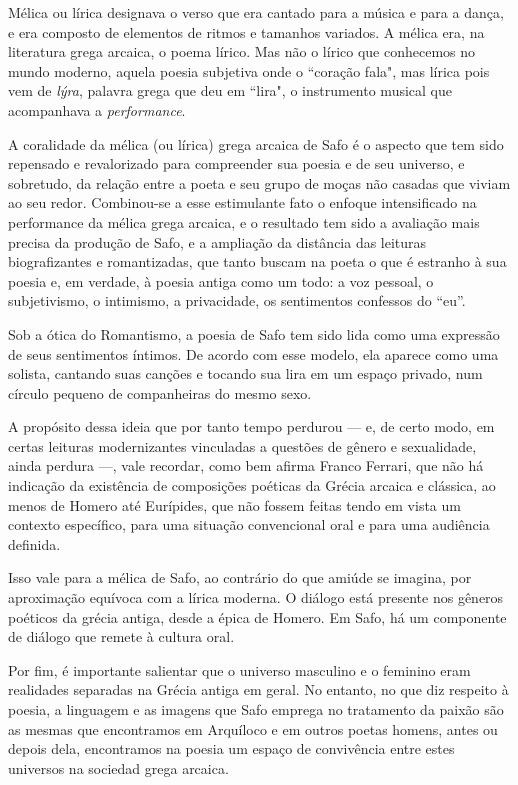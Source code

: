 \documentclass[12pt]{extarticle}
\begin{document}
Mélica ou lírica designava o verso que era cantado para a música e para a 
dança, e era composto de elementos de ritmos e tamanhos variados. A mélica era, 
na literatura grega arcaica, o poema lírico. Mas não o lírico que conhecemos no
mundo moderno, aquela poesia subjetiva onde o ``coração fala", mas lírica
pois vem de \textit{lýra}, palavra grega que deu em ``lira", o instrumento musical
que acompanhava a \textit{performance}.

A coralidade da mélica (ou lírica) grega arcaica de Safo é o aspecto que tem sido 
repensado e revalorizado para compreender sua poesia e de seu universo, e sobretudo, 
da relação entre a poeta e seu grupo de moças não casadas que viviam ao seu redor.
Combinou-se a esse estimulante fato o enfoque intensificado na performance da mélica 
grega arcaica, e o resultado tem sido a avaliação mais precisa da produção de Safo, 
e a ampliação da distância das leituras biografizantes e romantizadas, que tanto 
buscam na poeta o que é estranho à sua poesia e, em verdade, à poesia antiga como 
um todo: a voz pessoal, o subjetivismo, o intimismo, a privacidade, os sentimentos 
confessos do “eu”. 

Sob a ótica do Romantismo, a poesia de Safo tem sido lida como uma expressão de 
seus sentimentos íntimos. De acordo com esse modelo, ela aparece como uma solista, 
cantando suas canções e tocando sua lira em um espaço privado, num círculo 
pequeno de companheiras do mesmo sexo.

A propósito dessa ideia que por tanto tempo perdurou --- e, de certo modo, em
certas leituras modernizantes vinculadas a questões de gênero e sexualidade, 
ainda perdura ---, vale recordar, como bem afirma Franco Ferrari, que não há 
indicação da existência de composições poéticas da Grécia arcaica e clássica, 
ao menos de Homero até Eurípides, que não fossem feitas tendo em vista um 
contexto específico, para uma situação convencional oral e para uma audiência definida. 

Isso vale para a mélica de Safo, ao contrário do que amiúde se imagina, por 
aproximação equívoca com a lírica moderna. O diálogo está presente nos gêneros 
poéticos da grécia antiga, desde a épica de Homero. Em Safo, há um componente 
de diálogo que remete à cultura oral.
 
Por fim, é importante salientar que o universo masculino e o feminino eram 
realidades separadas na Grécia antiga em geral. No entanto, no que diz respeito
à poesia, a linguagem e as imagens que Safo emprega no tratamento da paixão 
são as mesmas que encontramos em Arquíloco e em outros poetas homens, antes 
ou depois dela, encontramos na poesia um espaço de convivência entre estes
universos na sociedad grega arcaica.
\end{document}
